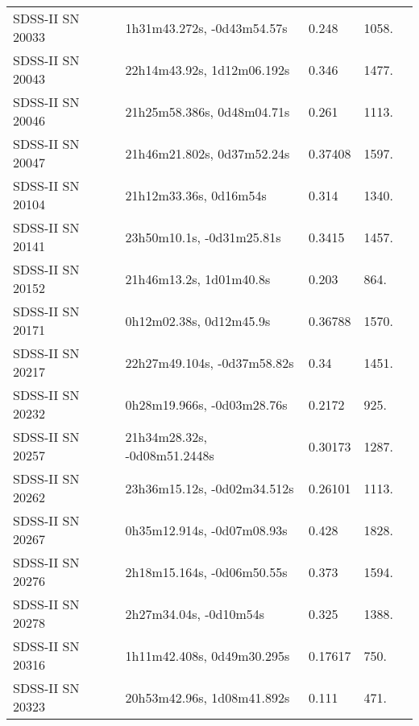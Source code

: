 \begin{longtable}{lllll}
 SDSS-II SN 20033 &     1h31m43.272s, -0d43m54.57s &    0.248 &          1058. &    \citet{2011ApJ...738..162S} \\
 SDSS-II SN 20043 &     22h14m43.92s, 1d12m06.192s &    0.346 &          1477. &    \citet{2011ApJ...738..162S} \\
 SDSS-II SN 20046 &     21h25m58.386s, 0d48m04.71s &    0.261 &          1113. &    \citet{2010ApJ...713.1026D} \\
 SDSS-II SN 20047 &     21h46m21.802s, 0d37m52.24s &  0.37408 &          1597. &    \citet{2004SDSS2.C...0000:} \\
 SDSS-II SN 20104 &         21h12m33.36s, 0d16m54s &    0.314 &          1340. &    \citet{2010ApJ...713.1026D} \\
 SDSS-II SN 20141 &      23h50m10.1s, -0d31m25.81s &   0.3415 &          1457. &    \citet{2011ApJ...738..162S} \\
 SDSS-II SN 20152 &        21h46m13.2s, 1d01m40.8s &    0.203 &           864. &    \citet{2011ApJ...738..162S} \\
 SDSS-II SN 20171 &        0h12m02.38s, 0d12m45.9s &  0.36788 &          1570. &    \citet{2016SDSSD.C...0000:} \\
 SDSS-II SN 20217 &    22h27m49.104s, -0d37m58.82s &     0.34 &          1451. &    \citet{2011ApJ...738..162S} \\
 SDSS-II SN 20232 &     0h28m19.966s, -0d03m28.76s &   0.2172 &           925. &    \citet{2011ApJ...738..162S} \\
 SDSS-II SN 20257 &   21h34m28.32s, -0d08m51.2448s &  0.30173 &          1287. &    \citet{2016SDSSD.C...0000:} \\
 SDSS-II SN 20262 &    23h36m15.12s, -0d02m34.512s &  0.26101 &          1113. &    \citet{2016SDSSD.C...0000:} \\
 SDSS-II SN 20267 &     0h35m12.914s, -0d07m08.93s &    0.428 &          1828. &    \citet{2011ApJ...738..162S} \\
 SDSS-II SN 20276 &     2h18m15.164s, -0d06m50.55s &    0.373 &          1594. &    \citet{2011ApJ...738..162S} \\
 SDSS-II SN 20278 &         2h27m34.04s, -0d10m54s &    0.325 &          1388. &    \citet{2010ApJ...713.1026D} \\
 SDSS-II SN 20316 &     1h11m42.408s, 0d49m30.295s &  0.17617 &           750. &    \citet{2016SDSSD.C...0000:} \\
 SDSS-II SN 20323 &     20h53m42.96s, 1d08m41.892s &    0.111 &           471. &    \citet{2011ApJ...738..162S} \\

\end{longtable}
